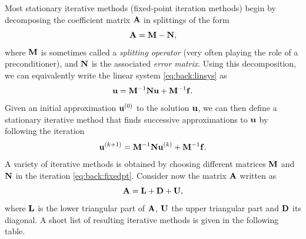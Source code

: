 Most stationary iterative methods (fixed-point iteration methods) begin
by decomposing the coefficient matrix $\mathbf{A}$ in splittings of the form
\begin{equation}
\label{eq:back:matsplit}
\mathbf{A} = \mathbf{M}-\mathbf{N},
\end{equation}
where $\mathbf{M}$ is sometimes called a \emph{splitting operator} (very often playing the role of a preconditioner), and $\mathbf{N}$ is the
associated \emph{error matrix}. Using this decomposition, we can equivalently write the linear system \eqref{eq:back:linsys} as
\begin{equation}\label{eq:back:linsys_b}
\mathbf{u} = \mathbf{M}^{-1} \mathbf{N}\mathbf{u} + \mathbf{M}^{-1} \mathbf{f}.
\end{equation}
Given an initial approximation $\mathbf{u}^{(0)}$ to the solution $\mathbf{u}$, we can then define a stationary iterative method that finds successive approximations to $\mathbf{u}$ by following the iteration
\begin{equation}\label{eq:back:fixedpt}
\mathbf{u}^{(k+1)} = \mathbf{M}^{-1} \mathbf{N}\mathbf{u}^{(k)} + \mathbf{M}^{-1} \mathbf{f}.
\end{equation}
A variety of iterative methods is obtained by choosing different matrices $\mathbf{M}$ and $\mathbf{N}$ in the iteration \eqref{eq:back:fixedpt}. Consider now the matrix $\mathbf{A}$ written as
\begin{equation*}
\mathbf{A}=\mathbf{L}+\mathbf{D}+\mathbf{U},
\end{equation*}
where $\mathbf{L}$ is the lower triangular part of $\mathbf{A}$, $\mathbf{U}$ the upper triangular part and $\mathbf{D}$ its diagonal. A short list of resulting iterative methods is given in the following table.
